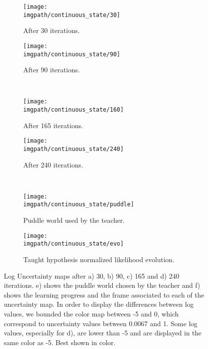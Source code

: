 \begin{figure}[!p]
  \centering
      \begin{subfigure}[b]{0.35\columnwidth}
          \centering
          \texttt{[image: \\imgpath/continuous\_state/30]}
          \caption{After 30 iterations.}
          \label{fig:30}
      \end{subfigure}
      \begin{subfigure}[b]{0.35\columnwidth}
          \centering
          \texttt{[image: \\imgpath/continuous\_state/90]}
          \caption{After 90 iterations.}
          \label{fig:90}
      \end{subfigure}\\
      \begin{subfigure}[b]{0.35\columnwidth}
          \centering
          \texttt{[image: \\imgpath/continuous\_state/160]}
          \caption{After 165 iterations.}
          \label{fig:165}
      \end{subfigure}
      \begin{subfigure}[b]{0.35\columnwidth}
          \centering
          \texttt{[image: \\imgpath/continuous\_state/240]}
          \caption{After 240 iterations.}
          \label{fig:240}
      \end{subfigure}\\
      \begin{subfigure}[b]{0.25\columnwidth}
          \centering
          \texttt{[image: \\imgpath/continuous\_state/puddle]}     
          \caption{Puddle world used by the teacher.}
          \label{fig:puddle}
      \end{subfigure}
      \begin{subfigure}[t]{0.45\columnwidth}
          \centering
          \texttt{[image: \\imgpath/continuous\_state/evo]}
          \caption{Taught hypothesis normalized likelihood evolution.}
          \label{fig:evo}
      \end{subfigure}
        
  \caption{Log Uncertainty maps after a) 30, b) 90, c) 165 and d) 240 iterations. e) shows the puddle world chosen by the teacher and f) shows the learning progress and the frame associated to each of the uncertainty map. In order to display the differences between log values, we bounded the color map between -5 and 0, which correspond to uncertainty values between 0.0067 and 1. Some log values, especially for d), are lower than -5 and are displayed in the same color as -5. Best shown in color.}
  \label{fig:continuousstateUncertaintyMap}
\end{figure}

